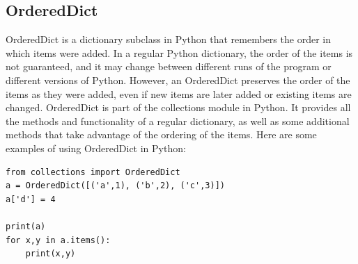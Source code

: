 \documentclass{report}
\begin{document}
    \pagebreak \bigbreak \noindent
    \subsection{OrderedDict}
    \bigbreak \noindent
    \bigbreak \noindent 
    OrderedDict is a dictionary subclass in Python that remembers the order in which items were added. In a regular Python dictionary, the order of the items is not guaranteed, and it may change between different runs of the program or different versions of Python. However, an OrderedDict preserves the order of the items as they were added, even if new items are later added or existing items are changed.
    \bigbreak \noindent 
    OrderedDict is part of the collections module in Python. It provides all the methods and functionality of a regular dictionary, as well as some additional methods that take advantage of the ordering of the items. Here are some examples of using OrderedDict in Python:
    \begin{verbatim}
from collections import OrderedDict
a = OrderedDict([('a',1), ('b',2), ('c',3)])
a['d'] = 4

print(a)
for x,y in a.items():
    print(x,y)
    \end{verbatim}
\end{document}

